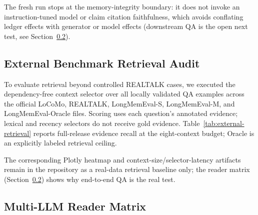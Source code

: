 The fresh run stops at the memory-integrity boundary: it does not invoke an instruction-tuned model or claim citation faithfulness, which avoids conflating ledger effects with generator or model effects (downstream QA is the open next test, see Section~\ref{sec:reader-matrix}).

\subsection{External Benchmark Retrieval Audit}\label{sec:external-retrieval}

To evaluate retrieval beyond controlled REALTALK cases, we executed the dependency-free context selector over all locally validated QA examples across the official LoCoMo, REALTALK, LongMemEval-S, LongMemEval-M, and Long\-Mem\-Eval-Oracle files. Scoring uses each question's annotated evidence; lexical and recency selectors do not receive gold evidence. Table~\ref{tab:external-retrieval} reports full-release evidence recall at the eight-context budget; Oracle is an explicitly labeled retrieval ceiling.

\begin{table}[!t]
\centering
\caption{Full-release evidence recall at the eight-context budget. Values are pooled over official questions; Oracle is an unbounded diagnostic ceiling in this retrieval-only audit.}
\label{tab:external-retrieval}
\end{table}

The corresponding Plotly heatmap and context-size\slash selector-latency artifacts remain in the repository as a real-data retrieval baseline only; the reader matrix (Section~\ref{sec:reader-matrix}) shows why end-to-end QA is the real test.

\subsection{Multi-LLM Reader Matrix}\label{sec:reader-matrix}

